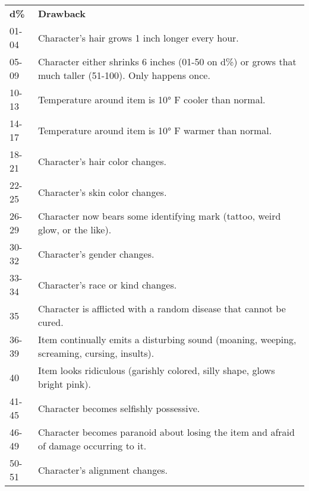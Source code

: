 \begin{tabular}{ll}
\textbf{d\%} & \textbf{Drawback}                                                                                       \\
01-04        & Character's hair grows 1 inch longer every hour.                                                        \\
05-09        & Character either shrinks 6 inches (01-50 on d\%) or grows that much taller (51-100). Only happens once. \\
10-13        & Temperature around item is 10° F cooler than normal.                                                    \\
14-17        & Temperature around item is 10° F warmer than normal.                                                    \\
18-21        & Character's hair color changes.                                                                         \\
22-25        & Character's skin color changes.                                                                         \\
26-29        & Character now bears some identifying mark (tattoo, weird glow, or the like).                            \\
30-32        & Character's gender changes.                                                                             \\
33-34        & Character's race or kind changes.                                                                       \\
35           & Character is afflicted with a random disease that cannot be cured.                                      \\
36-39        & Item continually emits a disturbing sound (moaning, weeping, screaming, cursing, insults).              \\
40           & Item looks ridiculous (garishly colored, silly shape, glows bright pink).                               \\
41-45        & Character becomes selfishly possessive.                                                                 \\
46-49        & Character becomes paranoid about losing the item and afraid of damage occurring to it.                  \\
50-51        & Character's alignment changes.                                                                          \\

\end{tabular}
